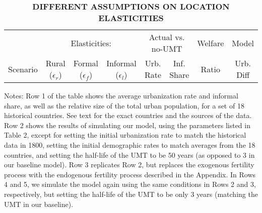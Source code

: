\documentclass[10pt]{article}
\begin{document}
\begin{table}[htb]
\begin{center}
\begin{footnotesize}
\caption{\textbf{DIFFERENT ASSUMPTIONS ON LOCATION ELASTICITIES}} \label{tab_elasticity}
\begin{tabular}{lccccccc}
\midrule
         & \multicolumn{3}{c}{Elasticities:} & \multicolumn{2}{c}{Actual vs. no-UMT} &Welfare & Model  \\ \cmidrule(lr){2-4} \cmidrule(lr){5-6} 
Scenario & Rural ($\epsilon_r$) & Formal ($\epsilon_f$) & Informal ($\epsilon_l$) & Urb. Rate & Inf. Share & Ratio & Urb. Diff \\ \midrule

\midrule
\end{tabular}
\end{footnotesize}
\end{center}
Notes: Row 1 of the table shows the average urbanization rate and informal share, as well as the relative size of the total urban population, for a set of 18 historical countries. See text for the exact countries and the sources of the data. Row 2 shows the results of simulating our model, using the parameters listed in Table 2, except for setting the initial urbanization rate to match the historical data in 1800, setting the initial demographic rates to match averages from the 18 countries, and setting the half-life of the UMT to be 50 years (as opposed to 3 in our baseline model). Row 3 replicates Row 2, but replaces the exogenous fertility process with the endogenous fertility process described in the Appendix. In Rows 4 and 5, we simulate the model again using the same conditions in Rows 2 and 3, respectively, but setting the half-life of the UMT to be only 3 years (matching the UMT in our baseline). 
\end{table}
\end{document}
